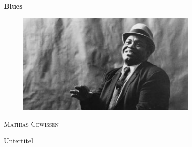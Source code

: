 \begin{titlepage}

    \vspace{20mm}

    \centering
    \huge\textbf{Blues}\par
    \vspace{3mm}

    \begin{figure}[htbp]
        \centering
        \includegraphics[width=0.8\textwidth]{images/title_img}
    \end{figure}

    \vspace{3mm}
    \textsc{\LARGE{Mathias Gewissen}}\par
    \vspace{3mm}
    \large Untertitel \par

\end{titlepage}